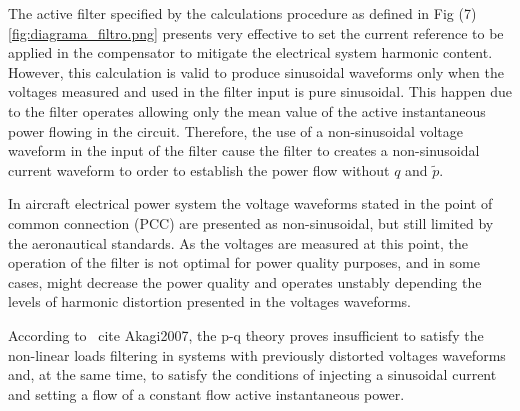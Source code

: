 The active filter specified by the calculations procedure as defined in Fig (7) \ref{fig:diagrama_filtro.png} presents very effective to set the current reference to be applied in the compensator to mitigate the electrical system harmonic content. However, this calculation is valid to produce sinusoidal waveforms only when the voltages measured and used in the filter input is pure sinusoidal. This happen due to the filter operates allowing only the mean value of the active instantaneous power flowing in the circuit. Therefore, the use of a non-sinusoidal voltage waveform in the input of the filter cause the filter to creates a non-sinusoidal current waveform to order to establish the power flow without $q$ and $\tilde{p}$.

In aircraft electrical power system the voltage waveforms stated in the point of common connection (PCC) are presented as non-sinusoidal, but still limited by the aeronautical standards. As the voltages are measured at this point, the operation of the filter is not optimal for power quality purposes, and in some cases, might decrease the power quality and operates unstably depending the levels of harmonic distortion presented in the voltages waveforms.

According to \ cite {Akagi2007}, the p-q theory proves insufficient to satisfy the non-linear loads filtering in systems with previously distorted voltages waveforms and, at the same time, to satisfy the conditions of injecting a sinusoidal current and setting a flow of a constant flow active instantaneous power.  
 

